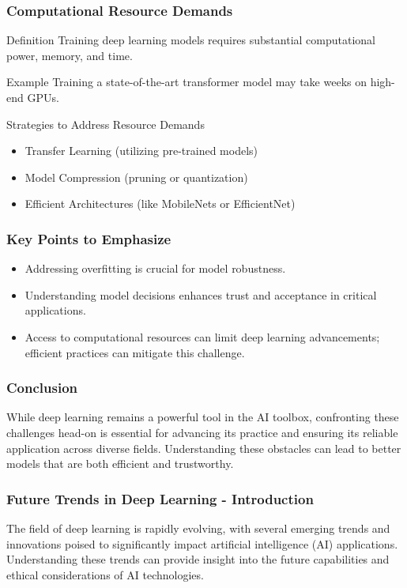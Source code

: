 \documentclass[aspectratio=169]{beamer}
\begin{document}
\begin{frame}[fragile]
    \frametitle{Computational Resource Demands}
    \begin{block}{Definition}
        Training deep learning models requires substantial computational power, memory, and time.
    \end{block}
    \begin{block}{Example}
        Training a state-of-the-art transformer model may take weeks on high-end GPUs.
    \end{block}
    \begin{block}{Strategies to Address Resource Demands}
        \begin{itemize}
            \item Transfer Learning (utilizing pre-trained models)
            \item Model Compression (pruning or quantization)
            \item Efficient Architectures (like MobileNets or EfficientNet)
        \end{itemize}
    \end{block}
\end{frame}

\begin{frame}[fragile]
    \frametitle{Key Points to Emphasize}
    \begin{itemize}
        \item Addressing overfitting is crucial for model robustness.
        \item Understanding model decisions enhances trust and acceptance in critical applications.
        \item Access to computational resources can limit deep learning advancements; efficient practices can mitigate this challenge.
    \end{itemize}
\end{frame}

\begin{frame}[fragile]
    \frametitle{Conclusion}
    While deep learning remains a powerful tool in the AI toolbox, confronting these challenges head-on is essential for advancing its practice and ensuring its reliable application across diverse fields. Understanding these obstacles can lead to better models that are both efficient and trustworthy.
\end{frame}

\begin{frame}[fragile]
    \frametitle{Future Trends in Deep Learning - Introduction}
    The field of deep learning is rapidly evolving, with several emerging trends and innovations poised to significantly impact artificial intelligence (AI) applications. Understanding these trends can provide insight into the future capabilities and ethical considerations of AI technologies.
\end{frame}
\end{document}
